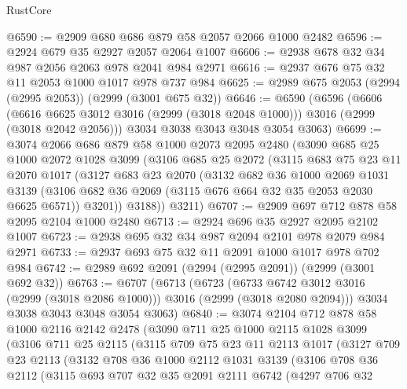 \begin{lexlean}{RustCore}
\begin{coremodule}
@6590 := @2909 @680 @686 @879 @58 @2057 @2066 @1000 @2482
@6596 := @2924 @679 @35 @2927 @2057 @2064 @1007
@6606 := @2938 @678 @32 @34 @987 @2056 @2063 @978 @2041 @984 @2971
@6616 := @2937 @676 @75 @32 @11 @2053 @1000 @1017 @978 @737 @984
@6625 := @2989 @675 @2053 (@2994 (@2995 @2053)) (@2999 (@3001 @675 @32))
@6646 := @6590
    (@6596
      (@6606
        (@6616 @6625 @3012 @3016 (@2999 (@3018 @2048 @1000)))
        @3016
        (@2999 (@3018 @2042 @2056)))
      @3034
      @3038
      @3043
      @3048
      @3054
      @3063)
@6699 := @3074
    @2066
    @686
    @879
    @58
    @1000
    @2073
    @2095
    @2480
    (@3090
      @685
      @25
      @1000
      @2072
      @1028
      @3099
      (@3106
        @685
        @25
        @2072
        (@3115
          @683
          @75
          @23
          @11
          @2070
          @1017
          (@3127
            @683
            @23
            @2070
            (@3132
              @682
              @36
              @1000
              @2069
              @1031
              @3139
              (@3106 @682 @36 @2069 (@3115 @676 @664 @32 @35 @2053 @2030 @6625 @6571))
              @3201))
          @3188))
      @3211)
@6707 := @2909 @697 @712 @878 @58 @2095 @2104 @1000 @2480
@6713 := @2924 @696 @35 @2927 @2095 @2102 @1007
@6723 := @2938 @695 @32 @34 @987 @2094 @2101 @978 @2079 @984 @2971
@6733 := @2937 @693 @75 @32 @11 @2091 @1000 @1017 @978 @702 @984
@6742 := @2989 @692 @2091 (@2994 (@2995 @2091)) (@2999 (@3001 @692 @32))
@6763 := @6707
    (@6713
      (@6723
        (@6733 @6742 @3012 @3016 (@2999 (@3018 @2086 @1000)))
        @3016
        (@2999 (@3018 @2080 @2094)))
      @3034
      @3038
      @3043
      @3048
      @3054
      @3063)
@6840 := @3074
    @2104
    @712
    @878
    @58
    @1000
    @2116
    @2142
    @2478
    (@3090
      @711
      @25
      @1000
      @2115
      @1028
      @3099
      (@3106
        @711
        @25
        @2115
        (@3115
          @709
          @75
          @23
          @11
          @2113
          @1017
          (@3127
            @709
            @23
            @2113
            (@3132
              @708
              @36
              @1000
              @2112
              @1031
              @3139
              (@3106
                @708
                @36
                @2112
                (@3115
                  @693
                  @707
                  @32
                  @35
                  @2091
                  @2111
                  @6742
                  (@4297
                    @706
                    @32

\end{coremodule}
\end{lexlean}
